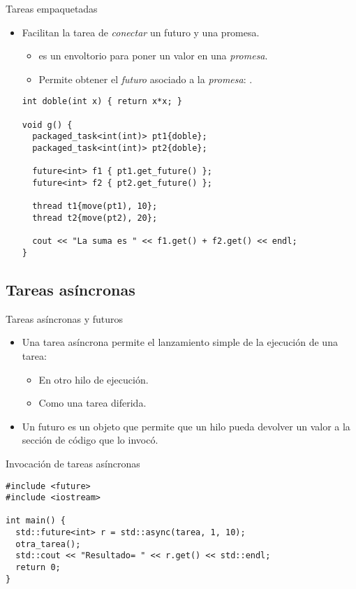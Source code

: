 \begin{frame}[fragile]{Tareas empaquetadas}
\begin{itemize}
  \item Facilitan la tarea de \emph{conectar} un futuro y una promesa.
    \begin{itemize}
      \item {} es un envoltorio para poner un valor en una \emph{promesa}.
      \item Permite obtener el \emph{futuro} asociado a la \emph{promesa}: .
    \end{itemize}
\begin{lstlisting}
int doble(int x) { return x*x; }

void g() {
  packaged_task<int(int)> pt1{doble};
  packaged_task<int(int)> pt2{doble};

  future<int> f1 { pt1.get_future() };
  future<int> f2 { pt2.get_future() };

  thread t1{move(pt1), 10};
  thread t2{move(pt2), 20};

  cout << "La suma es " << f1.get() + f2.get() << endl;
}
\end{lstlisting}
\end{itemize}
\end{frame}

\subsection{Tareas asíncronas}

\begin{frame}{Tareas asíncronas y futuros}
\begin{itemize}
  \item Una tarea asíncrona permite el lanzamiento simple de la ejecución de una tarea:
    \begin{itemize}
      \item En otro hilo de ejecución.
      \item Como una tarea diferida.
    \end{itemize}
  \item Un futuro es un objeto que permite que un hilo pueda devolver un valor a la sección de código que lo invocó.
\end{itemize}
\end{frame}

\begin{frame}[fragile]{Invocación de tareas asíncronas}
\begin{lstlisting}
#include <future>
#include <iostream>

int main() {
  std::future<int> r = std::async(tarea, 1, 10);
  otra_tarea();
  std::cout << "Resultado= " << r.get() << std::endl;
  return 0;
}
\end{lstlisting}
\end{frame}

